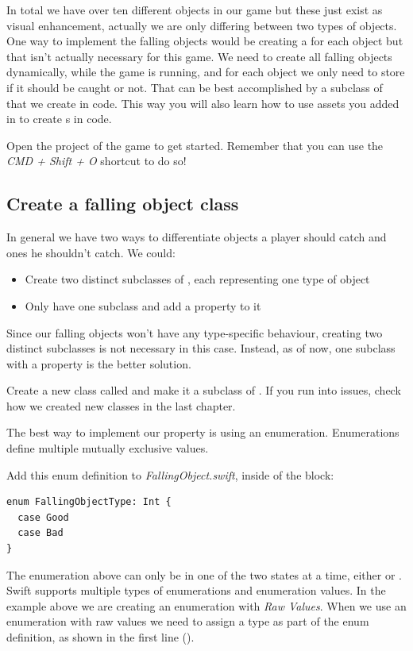 In total we have over ten different objects in our game but these just exist as
visual enhancement, actually we are only differing between two types of objects.
One way to implement the falling objects would be creating a \ccbfile{} for each
object but that isn't actually necessary for this game. We need to create all
falling objects dynamically, while the game is running, and for each object we
only need to store if it should be caught or not. That can be best accomplished
by a subclass of \ccsprite{} that we create in code. This way you will also
learn how to use assets you added in \SB{} to create \ccsprite{}s in code.
\begin{leftbar}
Open the \xcode{} project of the game to get started. Remember that you can use
the \textit{CMD + Shift + O} shortcut to do so!
\end{leftbar}

\subsection{Create a falling object class}
In general we have two ways to differentiate objects a player should catch and
ones he shouldn't catch. We could:
\begin{itemize}
  \item Create two distinct subclasses of \ccsprite{}, each representing one
  type of object
  \item Only have one subclass and add a  property to it
\end{itemize}
Since our falling objects won't have any type-specific behaviour, creating two
distinct subclasses is not necessary in this case. Instead, as of now, one
subclass with a  property is the better solution.

\begin{leftbar}
Create a new class called  and make it a subclass
of \ccsprite{}. If you run into issues, check how we created new classes in the
last chapter.
\end{leftbar}

The best way to implement our  property is using an 
enumeration. Enumerations define multiple mutually exclusive values.

\begin{leftbar}
Add this enum definition to \textit{FallingObject.swift},
inside of the  block:

\begin{lstlisting}
enum FallingObjectType: Int {
  case Good
  case Bad
}
\end{lstlisting}
\end{leftbar}
The enumeration above can only be in one of the two states at a time, either
 or . Swift supports multiple types of
enumerations and enumeration values.
In the example above we are creating an enumeration with \textit{Raw Values}.
When we use an enumeration with raw values we need to assign a type as part of
the enum definition, as shown in the first line (). 

